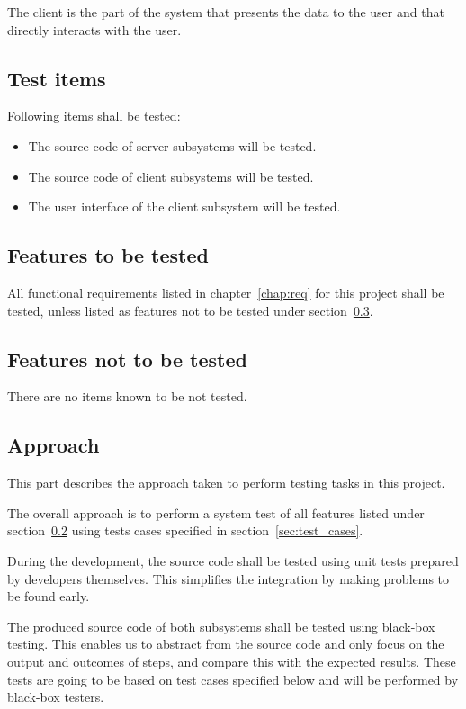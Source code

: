 \documentclass[11pt]{book}
\begin{document}
The client is the part of the system that presents the data to the user and that directly interacts with the user.

\subsection{Test items}
Following items shall be tested:

\begin{itemize}
    \item The source code of server subsystems will be tested.
    \item The source code of client subsystems will be tested.
    \item The user interface of the client subsystem will be tested.
\end{itemize}

\subsection{Features to be tested} \label{sec:test_plan_features_tested}
All functional requirements listed in chapter~\ref{chap:req} for this project shall be tested, unless listed as features not to be tested under section~\ref{sec:test_plan_features_not_tested}.

\subsection{Features not to be tested} \label{sec:test_plan_features_not_tested}
There are no items known to be not tested.

\subsection{Approach}
This part describes the approach taken to perform testing tasks in this project.

The overall approach is to perform a system test of all features listed under section~\ref{sec:test_plan_features_tested} using tests cases specified in section~\ref{sec:test_cases}.

During the development, the source code shall be tested using unit tests prepared by developers themselves. This simplifies the integration by making problems to be found early.

The produced source code of both subsystems shall be tested using black-box testing. This enables us to abstract from the source code and only focus on the output and outcomes of steps, and compare this with the expected results. These tests are going to be based on test cases specified below and will be performed by black-box testers.
\end{document}
